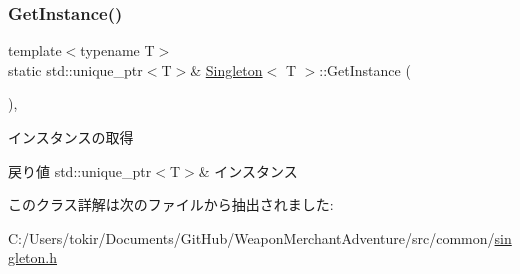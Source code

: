 \subsubsection{\texorpdfstring{Get\+Instance()}{GetInstance()}}
{\footnotesize\ttfamily template$<$typename T$>$ \\
static std\+::unique\+\_\+ptr$<$T$>$\& \mbox{\hyperlink{class_singleton}{Singleton}}$<$ T $>$\+::Get\+Instance (\begin{DoxyParamCaption}{ }\end{DoxyParamCaption})\hspace{0.3cm}{\ttfamily [inline]}, {\ttfamily [static]}}



インスタンスの取得 

\begin{DoxyReturn}{戻り値}
std\+::unique\+\_\+ptr$<$\+T$>$\& インスタンス 
\end{DoxyReturn}


このクラス詳解は次のファイルから抽出されました\+:\begin{DoxyCompactItemize}
\item 
C\+:/\+Users/tokir/\+Documents/\+Git\+Hub/\+Weapon\+Merchant\+Adventure/src/common/\mbox{\hyperlink{singleton_8h}{singleton.\+h}}\end{DoxyCompactItemize}
